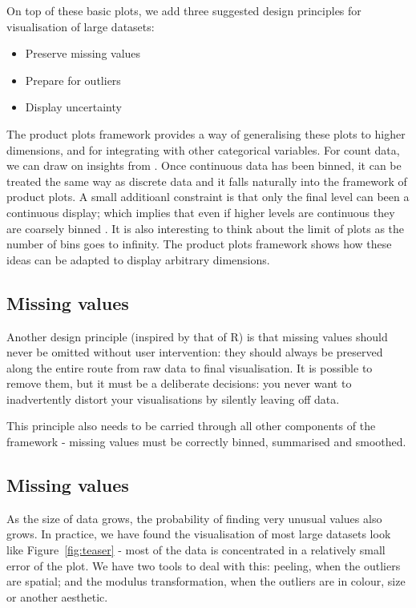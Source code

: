 \documentclass[journal]{vgtc}                %
\begin{document}
On top of these basic plots, we add three suggested design principles for visualisation of large datasets:

\begin{itemize}
  \item Preserve missing values
  \item Prepare for outliers
  \item Display uncertainty
\end{itemize}

The product plots \citep{me:prodplots} framework provides a way of generalising these plots to higher dimensions, and for integrating with other categorical variables. For count data, we can draw on insights from . Once continuous data has been binned, it can be treated the same way as discrete data and it falls naturally into the framework of product plots. A small additioanl constraint is that only the final level can been a continuous display; which implies that even if higher levels are continuous they are coarsely binned .  It is also interesting to think about the limit of plots as the number of bins goes to infinity.  The product plots framework shows how these ideas can be adapted to display arbitrary dimensions.

\subsection{Missing values}

Another design principle (inspired by that of R) is that missing values should never be omitted without user intervention: they should always be preserved along the entire route from raw data to final visualisation. It is possible to remove them, but it must be a deliberate decisions: you never want to inadvertently distort your visualisations by silently leaving off data.

This principle also needs to be carried through all other components of the framework - missing values must be correctly binned, summarised and smoothed.

\subsection{Missing values}

As the size of data grows, the probability of finding very unusual values also grows. In practice, we have found the visualisation of most large datasets look like Figure~\ref{fig:teaser} - most of the data is concentrated in a relatively small error of the plot. We have two tools to deal with this: peeling, when the outliers are spatial; and the modulus transformation, when the outliers are in colour, size or another aesthetic.
\end{document}
